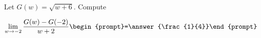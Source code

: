 \documentclass{ximera}
\author{Bart Snapp}
\begin{document}
\begin{exercise}
Let $G(w) = \sqrt{w+6}$. Compute

\[
\lim_{ w\to -2 } 
\frac{G(w)-G(-2)}{w+2} \begin{prompt}=\answer{\frac{1}{4}}\end{prompt}
\]
\end{exercise}
\end{document}
